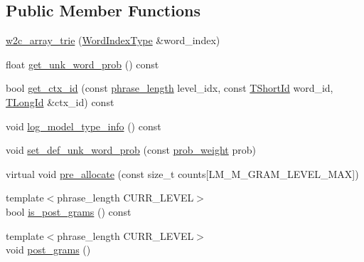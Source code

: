 \subsection*{Public Member Functions}
\begin{DoxyCompactItemize}
\item 
\hyperlink{classuva_1_1smt_1_1bpbd_1_1server_1_1lm_1_1w2c__array__trie_a9f7482321393a91264ab6b7670593ff1}{w2c\+\_\+array\+\_\+trie} (\hyperlink{classuva_1_1smt_1_1bpbd_1_1server_1_1lm_1_1word__index__trie__base_a64279b5b94c421b25aedaa72e73d013c}{Word\+Index\+Type} \&word\+\_\+index)
\item 
float \hyperlink{classuva_1_1smt_1_1bpbd_1_1server_1_1lm_1_1w2c__array__trie_a9ba392af01decd7a4746120256a7e654}{get\+\_\+unk\+\_\+word\+\_\+prob} () const 
\item 
bool \hyperlink{classuva_1_1smt_1_1bpbd_1_1server_1_1lm_1_1w2c__array__trie_ae1f95b7f1aa11be19f95d8cb64ebe769}{get\+\_\+ctx\+\_\+id} (const \hyperlink{namespaceuva_1_1smt_1_1bpbd_1_1server_af068a19c2e03116caf3e3827a3e40e35}{phrase\+\_\+length} level\+\_\+idx, const \hyperlink{namespaceuva_1_1smt_1_1bpbd_1_1server_1_1lm_1_1identifiers_a33043a191e9a637dea742a89d23c8bdc}{T\+Short\+Id} word\+\_\+id, \hyperlink{namespaceuva_1_1smt_1_1bpbd_1_1server_1_1lm_1_1identifiers_a6841847096e455ad3c38689bc548b3b0}{T\+Long\+Id} \&ctx\+\_\+id) const 
\item 
void \hyperlink{classuva_1_1smt_1_1bpbd_1_1server_1_1lm_1_1w2c__array__trie_a21a7ded6bee2fae130e120da22caf965}{log\+\_\+model\+\_\+type\+\_\+info} () const 
\item 
void \hyperlink{classuva_1_1smt_1_1bpbd_1_1server_1_1lm_1_1w2c__array__trie_a023c9781fd73484d858f094197757aa5}{set\+\_\+def\+\_\+unk\+\_\+word\+\_\+prob} (const \hyperlink{namespaceuva_1_1smt_1_1bpbd_1_1server_a01e9ea4de9c226f4464862e84ff0bbcc}{prob\+\_\+weight} prob)
\item 
virtual void \hyperlink{classuva_1_1smt_1_1bpbd_1_1server_1_1lm_1_1w2c__array__trie_a0833f065af125e47d7f98f5d0be1a0b7}{pre\+\_\+allocate} (const size\+\_\+t counts\mbox{[}L\+M\+\_\+\+M\+\_\+\+G\+R\+A\+M\+\_\+\+L\+E\+V\+E\+L\+\_\+\+M\+A\+X\mbox{]})
\item 
{\footnotesize template$<$phrase\+\_\+length C\+U\+R\+R\+\_\+\+L\+E\+V\+E\+L$>$ }\\bool \hyperlink{classuva_1_1smt_1_1bpbd_1_1server_1_1lm_1_1w2c__array__trie_a0c607945b84b473a8f372ff17688c5a1}{is\+\_\+post\+\_\+grams} () const 
\item 
{\footnotesize template$<$phrase\+\_\+length C\+U\+R\+R\+\_\+\+L\+E\+V\+E\+L$>$ }\\void \hyperlink{classuva_1_1smt_1_1bpbd_1_1server_1_1lm_1_1w2c__array__trie_af4d858d2d99143a930a24129f5b53d26}{post\+\_\+grams} ()

\end{DoxyCompactItemize}
